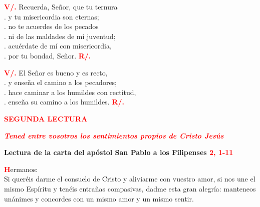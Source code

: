 \documentclass[12pt, letterpaper]{report}
\begin{document}
{\bfseries \textcolor{red}{V/.}} \hspace{1cm} Recuerda, Se\~nor, que tu ternura\\
. \hspace{2.5cm} y tu misericordia son eternas;\\
. \hspace{2.5cm} no te acuerdes de los pecados\\
. \hspace{2.5cm} ni de las maldades de mi juventud;\\
. \hspace{2.5cm} acu\'erdate de m\'i con misericordia,\\
. \hspace{2.5cm} por tu bondad, Se\~nor.
\hspace{1cm} {\bfseries \textcolor{red}{R/.}}

{\bfseries \textcolor{red}{V/.}} \hspace{1cm} El Se\~nor es bueno y es recto,\\
. \hspace{2.5cm} y ense\~na el camino a los pecadores;\\
. \hspace{2.5cm} hace caminar a los humildes con rectitud,\\
. \hspace{2.5cm} ense\~na su camino a los humildes.
\hspace{1cm} {\bfseries \textcolor{red}{R/.}}

\newpage

\begin{center}
\Large {\bfseries \textcolor{red}{SEGUNDA LECTURA}}
\end{center}

\begin{center}
\large {\bfseries \textit{ \textcolor{red}{Tened entre vosotros los sentimientos propios de Cristo Jes\'us}}}
\end{center}

\Large {\bfseries Lectura de la carta del ap\'ostol San Pablo a los Filipenses \hspace{1cm} \textcolor{red}{2, 1-11}}

\lettrine[lines=1]{\bfseries \textcolor{red}{H}}{}\Large ermanos:\\
Si quer\'eis darme el consuelo de Cristo y aliviarme con vuestro amor, si nos une el mismo Esp\'iritu y ten\'eis entra\~nas compasivas, dadme esta gran alegr\'ia: manteneos un\'animes y concordes con un mismo amor y un mismo sentir.
\end{document}
